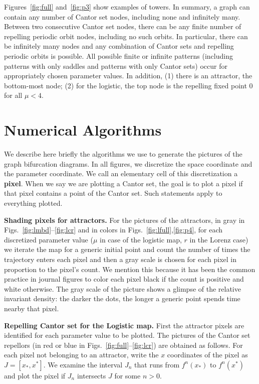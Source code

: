 \documentclass{article}
\newcommand{\jim}{\color{black} }
\begin{document}
Figures~\ref{fig:full} and~\ref{fig:p3} show examples of towers.
In summary, a graph can contain any number of Cantor set nodes, including none and infinitely many. 
Between two consecutive Cantor set nodes, there can be any finite number of repelling periodic orbit nodes, including no such orbits.
In particular, there can be infinitely many nodes and any combination of Cantor sets and repelling periodic orbits is possible.
All possible finite or infinite patterns (including patterns with only saddles and patterns with only Cantor sets) occur for appropriately chosen parameter values.
In addition, (1) there is an attractor, the bottom-most node; (2) for the logistic, the top node is the repelling fixed point 0 for all $\mu<4$.
{\jim
\section{Numerical Algorithms}
\label{sec:numerics}

We describe here briefly the algorithms we use to generate the pictures of the graph bifurcation diagrams. In all figures, we discretize the space coordinate and the parameter coordinate. We call an elementary cell of this discretization a {\bf pixel}.
When we say we are plotting a Cantor set, the goal is to plot a pixel if that pixel contains a point of the Cantor set. Such statements apply to everything plotted.

{\bf  Shading pixels for attractors.} 
For the pictures of the attractors, in gray in Figs.~\ref{fig:lmbd}--\ref{fig:lcr} and in colors in Figs.~\ref{fig:lfull},\ref{fig:p4},
for each discretized parameter value ($\mu$ in case of the logistic map, $r$ in the Lorenz case)  we iterate the map for a generic initial point and count the number of times the trajectory enters each pixel and then a gray scale is chosen for each pixel in proportion to the pixel's count. We mention this because it has been the common practice in journal figures to color each pixel black if the count is positive and white otherwise.
The gray scale of the picture shows a glimpse of the relative invariant density: the darker the dots, the longer a generic point spends time nearby that pixel.

{\bf Repelling Cantor set for the Logistic map.} First the attractor pixels are identified for each parameter value to be plotted.
The pictures of the Cantor set repellors (in red or blue in Figs.~\ref{fig:full}--\ref{fig:lcr}) are obtained as follows. For each pixel not belonging to an attractor, write the $x$ coordinates of the pixel as $J=[x_*,x^*]$. We examine the interval $J_n$ that runs from $f^n(x_*)$ to $f^n(x^*)$ and plot the pixel if $J_n$ intersects $J$ for some $n>0$.


}
\end{document}
